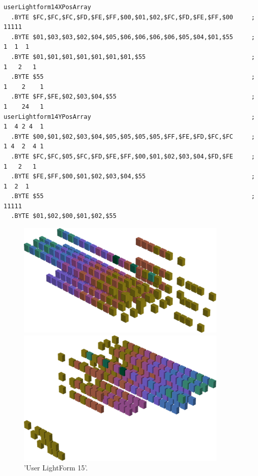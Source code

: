 \begin{minipage}[b]{0.68\linewidth}
\vspace{0.5cm}
\begin{lrbox}{\mybox}%
\begin{lstlisting}[basicstyle=\ttfamily\tiny,escapechar=\%]
userLightform14XPosArray
  .BYTE $FC,$FC,$FC,$FD,$FE,$FF,$00,$01,$02,$FC,$FD,$FE,$FF,$00     ;    11111   
  .BYTE $01,$03,$03,$02,$04,$05,$06,$06,$06,$06,$05,$04,$01,$55     ;   1  1  1  
  .BYTE $01,$01,$01,$01,$01,$01,$01,$55                             ;  1   2   1 
  .BYTE $55                                                         ; 1    2    1
  .BYTE $FF,$FE,$02,$03,$04,$55                                     ; 1    24   1
userLightform14YPosArray                                            ; 1  4 2 4  1
  .BYTE $00,$01,$02,$03,$04,$05,$05,$05,$05,$FF,$FE,$FD,$FC,$FC     ; 1 4  2  4 1
  .BYTE $FC,$FC,$05,$FC,$FD,$FE,$FF,$00,$01,$02,$03,$04,$FD,$FE     ;  1   2   1 
  .BYTE $FE,$FF,$00,$01,$02,$03,$04,$55                             ;   1  2  1  
  .BYTE $55                                                         ;    11111   
  .BYTE $01,$02,$00,$01,$02,$55
\end{lstlisting}
\end{lrbox}%
\scalebox{0.8}{\usebox{\mybox}}

\end{minipage}
%
%
\begin{minipage}[b]{0.48\linewidth}
\begin{figure}[H]
    \centering
    \begin{adjustbox}{width=5cm,margin=0cm 0cm}
      \includegraphics[width=10cm]{src/colorspace_patterns/pattern23-45.png}%
    \end{adjustbox}
    \begin{adjustbox}{width=5cm,margin=0cm 0cm}
      \includegraphics[width=10cm]{src/colorspace_patterns/pattern23-225.png}%
    \end{adjustbox}
\caption{'User LightForm 15'.}
\end{figure}
\end{minipage}
